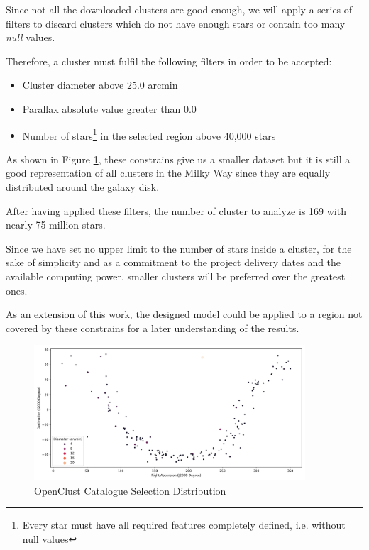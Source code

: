 \documentclass[11pt, a4paper, english]{book}
\begin{document}
Since not all the downloaded clusters are good enough,
we will apply a series of filters to discard clusters which do not have enough stars
or contain too many \emph{null} values.

Therefore, a cluster must fulfil the following filters in order to be accepted:

\begin{itemize}
  \item Cluster diameter above 25.0 arcmin
  \item Parallax absolute value greater than 0.0
  \item Number of stars\footnote{Every star must have all required features completely defined, i.e. without null values}
        in the selected region above 40,000 stars
\end{itemize}

As shown in Figure \ref{fig:OpenClustSelection},
these constrains give us a smaller dataset but it is still a good representation of all clusters in the Milky Way
since they are equally distributed around the galaxy disk.

After having applied these filters, the number of cluster to analyze is 169 with nearly 75 million stars.

Since we have set no upper limit to the number of stars inside a cluster,
for the sake of simplicity and as a commitment to the project delivery dates
and the available computing power, smaller clusters will be preferred over the greatest ones.

As an extension of this work, the designed model could be applied to a region not covered by these constrains
for a later understanding of the results.

\begin{figure}[htbp]
  \centering
  \includegraphics[width=0.9\textwidth]{../figures/cluster_selection_tier1.png}
  \caption{OpenClust Catalogue Selection Distribution}
  \label{fig:OpenClustSelection}
\end{figure}
\end{document}
